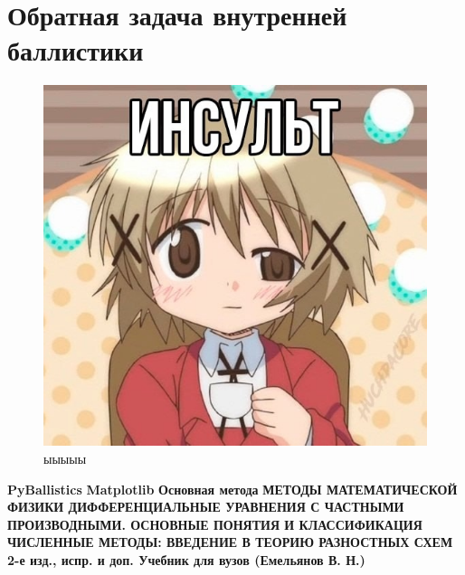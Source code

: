 \documentclass[14pt, a4paper]{report} %
\begin{document}
\section{Обратная задача внутренней баллистики}

\begin{figure}[h!]
\centering
\includegraphics[width=0.45\textheight]{imgs/3.jpg}
\caption{ыыыыы}
\end{figure}

\newpage
\begin{thebibliography}{9}
\bibitem{} \textbf{PyBallistics}
\bibitem{} \textbf{Matplotlib} 
\bibitem{} \textbf{Основная метода} 
\bibitem{} \textbf{МЕТОДЫ МАТЕМАТИЧЕСКОЙ ФИЗИКИ 
ДИФФЕРЕНЦИАЛЬНЫЕ УРАВНЕНИЯ 
С ЧАСТНЫМИ ПРОИЗВОДНЫМИ. 
ОСНОВНЫЕ ПОНЯТИЯ И КЛАССИФИКАЦИЯ } 
\bibitem{} \textbf{ЧИСЛЕННЫЕ МЕТОДЫ: ВВЕДЕНИЕ В ТЕОРИЮ РАЗНОСТНЫХ СХЕМ 2-е изд., испр. и доп. Учебник для вузов (Емельянов В. Н.)} 
\end{thebibliography}
\end{document}
